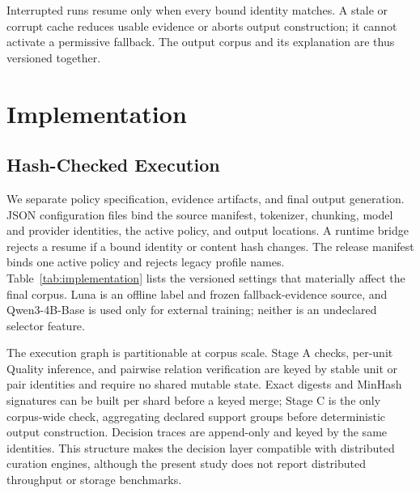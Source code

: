 \documentclass[conference]{IEEEtran}
\begin{document}
Interrupted runs resume only when every bound identity matches. A stale or
corrupt cache reduces usable evidence or aborts output construction; it cannot
activate a permissive fallback. The output corpus and its explanation are thus
versioned together.

\section{Implementation}
\subsection{Hash-Checked Execution}
We separate policy specification, evidence artifacts, and
final output generation. JSON configuration files bind the source manifest, tokenizer, chunking,
model and provider identities, the active policy, and output locations. A
runtime bridge rejects a resume if a bound identity or content hash changes.
The release manifest binds one active policy and rejects legacy profile names.
Table~\ref{tab:implementation} lists the versioned settings that materially
affect the final corpus. Luna is an offline label and frozen fallback-evidence
source, and Qwen3-4B-Base is
used only for external training; neither is an undeclared selector feature.

The execution graph is partitionable at corpus scale. Stage A checks,
per-unit Quality inference, and pairwise relation verification are keyed by
stable unit or pair identities and require no shared mutable state. Exact
digests and MinHash signatures can be built per shard before a keyed merge;
Stage C is the only corpus-wide check, aggregating declared support
groups before deterministic output construction. Decision traces are append-only
and keyed by the same identities. This structure makes the decision layer
compatible with distributed curation engines, although the present study does
not report distributed throughput or storage benchmarks.
\end{document}
